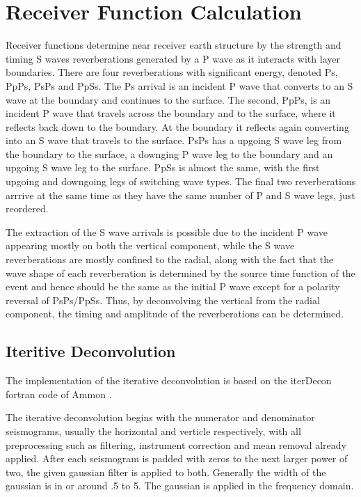 \documentclass[titlepage]{article}
\begin{document}
\section{Receiver Function Calculation}

Receiver functions determine near receiver earth structure by the strength and timing S waves reverberations generated by a P wave as it interacts with layer boundaries. There are four reverberations with significant energy, denoted Ps, PpPs, PsPs and PpSs. The Ps arrival is an incident P wave that converts to an S wave at the boundary and continues to the surface. The second, PpPs, is an incident P wave that travels across the boundary and to the surface, where it reflects back down to the boundary. At the boundary it reflects again converting into an S wave that travels to the surface. PsPs has a upgoing S wave leg from the boundary to the surface, a downging P wave leg to the boundary and an upgoing S wave leg to the surface. PpSs is almost the same, with the first upgoing and downgoing legs of switching wave types. The final two reverberations arrrive at the same time as they have the same number of P and S wave legs, just reordered.

The extraction of the S wave arrivals is possible due to the incident P wave appearing mostly on both the vertical component, while the S wave reverberations are mostly confined to the radial, along with the fact that the wave shape of each reverberation is determined by the source time function of the event and hence should be the same as the initial P wave except for a polarity reversal of PsPs/PpSs. Thus, by deconvolving the vertical from the radial component, the timing and amplitude of the reverberations can be determined. 


\subsection{Iteritive Deconvolution}

The implementation of the iterative deconvolution is based on the iterDecon fortran code of Ammon \cite{iterdecon}. 

The iterative deconvolution begins with the numerator and denominator seismograms, usually the horizontal and verticle respectively, with all preprocessing such as filtering, instrument correction and mean removal already applied. After each seismogram is padded with zeros to the next larger power of two, the given gaussian filter is applied to both. Generally the width of the gaussian is in or around .5 to 5. The gaussian is applied in the frequency domain.
\end{document}
